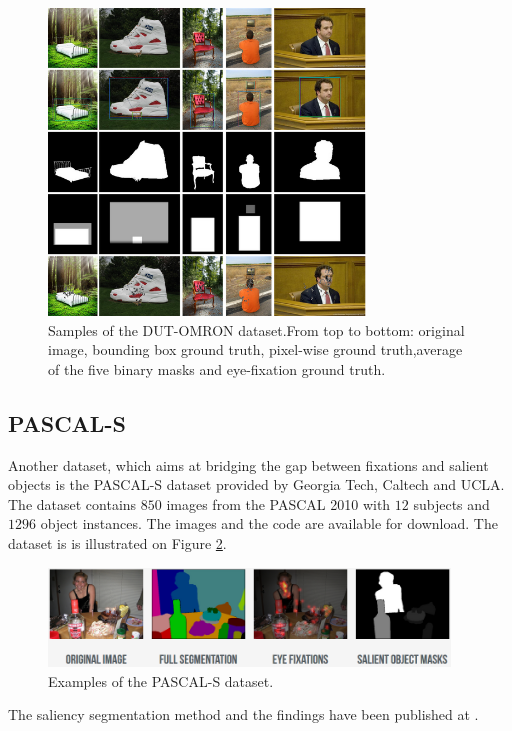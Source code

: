 \begin{figure}[h]
\begin{center}
\includegraphics[width=0.75\textwidth]{fig/DUT-OMRON}
\end{center}
\caption{Samples of the DUT-OMRON dataset.From top to bottom: original image, bounding box ground truth, pixel-wise ground truth,average of the five binary masks and eye-fixation ground truth. }
\label{fig:dut-omron}
\end{figure}

\subsection{PASCAL-S}
Another dataset, which aims at bridging the gap between fixations and salient objects is the PASCAL-S dataset \cite{pascal-s_db} provided by Georgia Tech, Caltech and UCLA. The dataset contains $850$ images from the PASCAL 2010 with $12$ subjects and $1296$ object instances. The images and the code are available for download. The dataset is is illustrated on Figure \ref{fig:pascal-s}.

\begin{figure}[H]
\begin{center}
\includegraphics[width=0.95\textwidth]{fig/PASCAL-S}
\end{center}
\caption{Examples of the PASCAL-S dataset.}
\label{fig:pascal-s}
\end{figure}


The saliency segmentation method and the findings have been published at \cite{TPAMI.2012.147}.  
